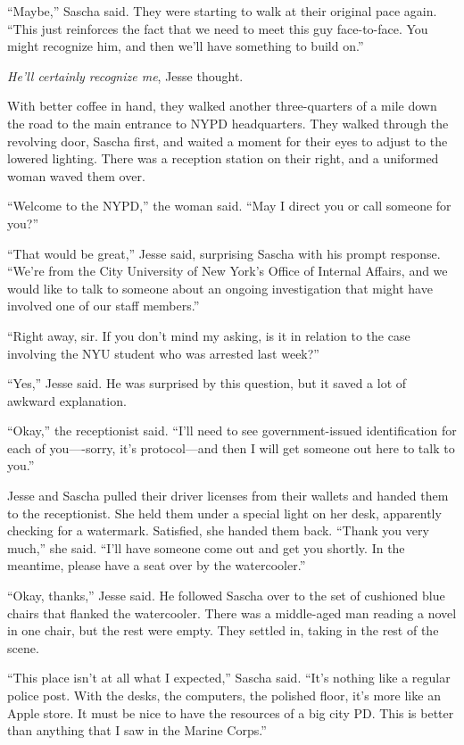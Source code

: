 \documentclass[12pt]{book}
\begin{document}
``Maybe,'' Sascha said.  They were starting to walk at their original pace again.  ``This just reinforces the fact that we need to meet this guy face-to-face.  You might recognize him, and then we'll have something to build on.''

\emph{He'll certainly recognize me}, Jesse thought.


With better coffee in hand, they walked another three-quarters of a mile down the road to the main entrance to NYPD headquarters.  They walked through the revolving door, Sascha first, and waited a moment for their eyes to adjust to the lowered lighting.  There was a reception station on their right, and a uniformed woman waved them over.

``Welcome to the NYPD,'' the woman said.  ``May I direct you or call someone for you?''

``That would be great,'' Jesse said, surprising Sascha with his prompt response.  ``We're from the City University of New York's Office of Internal Affairs, and we would like to talk to someone about an ongoing investigation that might have involved one of our staff members.''

``Right away, sir.  If you don't mind my asking, is it in relation to the case involving the NYU student who was arrested last week?''

``Yes,'' Jesse said.  He was surprised by this question, but it saved a lot of awkward explanation.

``Okay,'' the receptionist said.  ``I'll need to see government-issued identification for each of you----sorry, it's protocol---and then I will get someone out here to talk to you.''

Jesse and Sascha pulled their driver licenses from their wallets and handed them to the receptionist.  She held them under a special light on her desk, apparently checking for a watermark.  Satisfied, she handed them back.  ``Thank you very much,'' she said.  ``I'll have someone come out and get you shortly.  In the meantime, please have a seat over by the watercooler.''

``Okay, thanks,'' Jesse said.  He followed Sascha over to the set of cushioned blue chairs that flanked the watercooler.  There was a middle-aged man reading a novel in one chair, but the rest were empty.  They settled in, taking in the rest of the scene.

``This place isn't at all what I expected,'' Sascha said.  ``It's nothing like a regular police post.  With the desks, the computers, the polished floor, it's more like an Apple store.  It must be nice to have the resources of a big city PD.  This is better than anything that I saw in the Marine Corps.''
\end{document}
